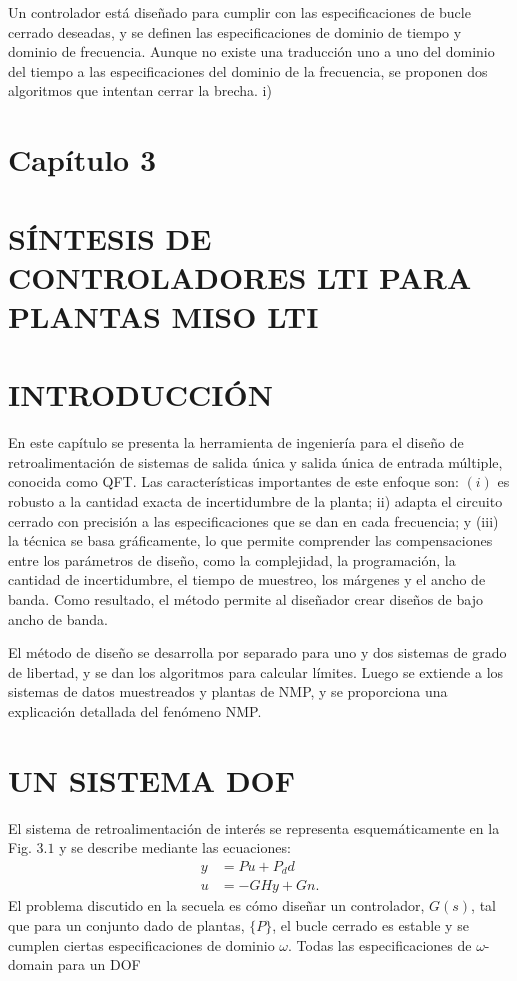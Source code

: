 Un controlador está diseñado para cumplir con las especificaciones de bucle cerrado deseadas, y se definen las especificaciones de dominio de tiempo y dominio de frecuencia. Aunque no existe una traducción uno a uno del dominio del tiempo a las especificaciones del dominio de la frecuencia, se proponen dos algoritmos que intentan cerrar la brecha. i)

\section{Capítulo 3}
\section{SÍNTESIS DE CONTROLADORES LTI PARA PLANTAS MISO LTI}
\section{INTRODUCCIÓN}
En este capítulo se presenta la herramienta de ingeniería para el diseño de retroalimentación de sistemas de salida única y salida única de entrada múltiple, conocida como QFT. Las características importantes de este enfoque son: $(i)$ es robusto a la cantidad exacta de incertidumbre de la planta; ii) adapta el circuito cerrado con precisión a las especificaciones que se dan en cada frecuencia; y (iii) la técnica se basa gráficamente, lo que permite comprender las compensaciones entre los parámetros de diseño, como la complejidad, la programación, la cantidad de incertidumbre, el tiempo de muestreo, los márgenes y el ancho de banda. Como resultado, el método permite al diseñador crear diseños de bajo ancho de banda.

El método de diseño se desarrolla por separado para uno y dos sistemas de grado de libertad, y se dan los algoritmos para calcular límites. Luego se extiende a los sistemas de datos muestreados y plantas de NMP, y se proporciona una explicación detallada del fenómeno NMP.

\section{UN SISTEMA DOF}
El sistema de retroalimentación de interés se representa esquemáticamente en la Fig. $3.1$ y se describe mediante las ecuaciones:
$$
\begin{aligned}
y &=P u+P_{d} d \\
u &=-G H y+G n .
\end{aligned}
$$
El problema discutido en la secuela es cómo diseñar un controlador, $G(s)$, tal que para un conjunto dado de plantas, $\{P\}$, el bucle cerrado es estable y se cumplen ciertas especificaciones de dominio $\omega$. Todas las especificaciones de $\omega$-domain para un DOF

